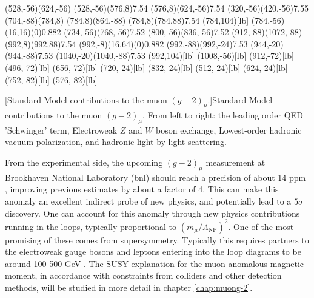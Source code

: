 \begin{itemize}
\begin{center}
{{\begin{axopicture}
\Line[arrow,arrowpos=0.5,arrowlength=5,arrowwidth=2,arrowinset=0.2](528,-56)(624,-56)
    \Photon(528,-56)(576,8){7.5}{4}
    \Photon(576,8)(624,-56){7.5}{4}
    \Photon(320,-56)(420,-56){7.5}{5}
\Line[arrow,arrowpos=0.5,arrowlength=5,arrowwidth=2,arrowinset=0.2](704,-88)(784,8)
\Line[arrow,arrowpos=0.5,arrowlength=5,arrowwidth=2,arrowinset=0.2](784,8)(864,-88)
    \Photon(784,8)(784,88){7.5}{4}
    \Text(784,104)[lb]{\Large{\Black{$\gamma$}}}
    \GOval(784,-56)(16,16)(0){0.882}
    \Photon(734,-56)(768,-56){7.5}{2}
    \Photon(800,-56)(836,-56){7.5}{2}
\Line[arrow,arrowpos=0.5,arrowlength=5,arrowwidth=2,arrowinset=0.2](912,-88)(1072,-88)
    \Photon(992,8)(992,88){7.5}{4}
    \GOval(992,-8)(16,64)(0){0.882}
    \Photon(992,-88)(992,-24){7.5}{3}
    \Photon(944,-20)(944,-88){7.5}{3}
    \Photon(1040,-20)(1040,-88){7.5}{3}
    \Text(992,104)[lb]{\Large{\Black{$\gamma$}}}
    \Text(1008,-56)[lb]{\Large{\Black{$\gamma$}}}
    \Text(912,-72)[lb]{\Large{\Black{$\mu^{-}$}}}
    \Text(496,-72)[lb]{\Large{\Black{$\mu^{-}$}}}
    \Text(656,-72)[lb]{\Large{\Black{$\mu^{-}$}}}
    \Text(720,-24)[lb]{\Large{\Black{$\mu^{-}$}}}
    \Text(832,-24)[lb]{\Large{\Black{$\mu^{-}$}}}
    \Text(512,-24)[lb]{\Large{}}
    \Text(624,-24)[lb]{\Large{}}
    \Text(752,-82)[lb]{\Large{\Black{$\gamma$}}}
    \Text(576,-82)[lb]{\Large{\Black{$\nu_{\mu}$}}}
  \end{axopicture}
}}
\vspace{5mm}
[Standard Model contributions to the muon $(g-2)_{\mu}$.]{Standard Model contributions to the muon $(g-2)_{\mu}$. From left to right: the leading order QED 'Schwinger' term, Electroweak $Z$ and $W$ boson exchange, Lowest-order hadronic vacuum polarization, and hadronic light-by-light scattering.}
\label{fig:SMg-2}
\end{center}

From the experimental side, the upcoming $(g-2)_{\mu}$ measurement at Brookhaven National Laboratory (\acrshort{bnl}) should reach a precision of about 14 ppm \cite{RN116}, improving previous estimates by about a factor of 4. This can make this anomaly an excellent indirect probe of new physics, and potentially lead to a $5\sigma$ discovery. One can account for this anomaly through new physics contributions running in the loops, typically proportional to $(m_{\mu}/\Lambda_{\text{NP}})^2$. One of the most promising of these comes from supersymmetry. Typically this requires partners to the electroweak gauge bosons and leptons entering into the loop diagrams to be around 100-500 GeV \cite{RN95}. The SUSY explanation for the muon anomalous magnetic moment, in accordance with constraints from colliders and other detection methods, will be studied in more detail in chapter \ref{chap:muong-2}.
\end{itemize}
